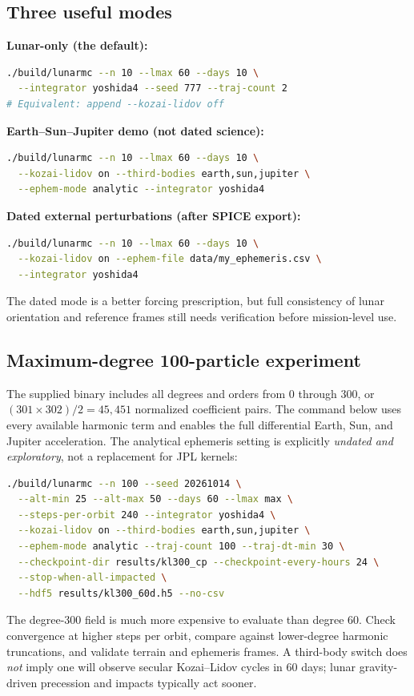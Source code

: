 \documentclass[11pt,a4paper]{article}
\begin{document}
\subsection{Three useful modes}
\textbf{Lunar-only (the default):}
\begin{lstlisting}[language=bash]
./build/lunarmc --n 10 --lmax 60 --days 10 \
  --integrator yoshida4 --seed 777 --traj-count 2
# Equivalent: append --kozai-lidov off
\end{lstlisting}
\textbf{Earth--Sun--Jupiter demo (not dated science):}
\begin{lstlisting}[language=bash]
./build/lunarmc --n 10 --lmax 60 --days 10 \
  --kozai-lidov on --third-bodies earth,sun,jupiter \
  --ephem-mode analytic --integrator yoshida4
\end{lstlisting}
\textbf{Dated external perturbations (after SPICE export):}
\begin{lstlisting}[language=bash]
./build/lunarmc --n 10 --lmax 60 --days 10 \
  --kozai-lidov on --ephem-file data/my_ephemeris.csv \
  --integrator yoshida4
\end{lstlisting}
The dated mode is a better forcing prescription, but full consistency of lunar orientation and reference frames still needs verification before mission-level use.

\subsection{Maximum-degree 100-particle experiment}
The supplied binary includes all degrees and orders from $0$ through $300$, or
$(301\times302)/2=45,451$ normalized coefficient pairs. The command below
uses every available harmonic term and enables the full differential Earth,
Sun, and Jupiter acceleration. The analytical ephemeris setting is explicitly
\emph{undated and exploratory}, not a replacement for JPL kernels:
\begin{lstlisting}[language=bash]
./build/lunarmc --n 100 --seed 20261014 \
  --alt-min 25 --alt-max 50 --days 60 --lmax max \
  --steps-per-orbit 240 --integrator yoshida4 \
  --kozai-lidov on --third-bodies earth,sun,jupiter \
  --ephem-mode analytic --traj-count 100 --traj-dt-min 30 \
  --checkpoint-dir results/kl300_cp --checkpoint-every-hours 24 \
  --stop-when-all-impacted \
  --hdf5 results/kl300_60d.h5 --no-csv
\end{lstlisting}
The degree-300 field is much more expensive to evaluate than degree 60.
Check convergence at higher steps per orbit, compare against lower-degree
harmonic truncations, and validate terrain and ephemeris frames. A third-body
switch does \emph{not} imply one will observe secular Kozai--Lidov cycles in
60 days; lunar gravity-driven precession and impacts typically act sooner.
\end{document}
